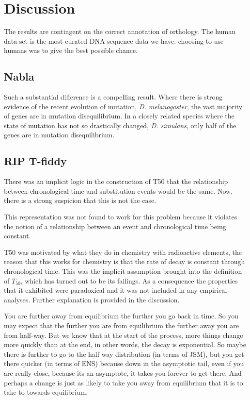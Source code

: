 \chapter{Discussion}

The results are contingent on the correct annotation of orthology. The human data set is the most curated DNA sequence data we have. choosing to use humans was to give the best possible chance.

\section{Nabla}
Such a substantial difference is a compelling result. Where there is strong evidence of the recent evolution of mutation, \textit{D. melanogaster}, the vast majority of genes are in mutation disequilibrium. In a closely related species where the state of mutation has not so drastically changed, \textit{D. simulans}, only half of the genes are in mutation disequilibrium. 

\section{RIP T-fiddy}

There was an implicit logic in the construction of T50 that the relationship between chronological time and substitution events would be the same. Now, there is a strong suspicion that this is not the case. 

This representation was not found to work for this problem because it violates the notion of a relationship between an event and chronological time being constant. 

T50 was motivated by what they do in chemistry with radioactive elements, the reason that this works for chemistry is that the rate of decay is constant through chronological time. This was the implicit assumption brought into the definition of $T_{50}$, which has turned out to be its failings. As a consequence the properties that it exhibited were paradoxical and it was not included in any empirical analyses. Further explanation is provided in the discussion. 


You are further away from equilibrium the further you go back in time. So you may expect that the further you are from equilibrium the further away you are from half-way. But we know that at the start of the process, more things change more quickly than at the end, in other words, the decay is exponential. So maybe there is further to go to the half way distribution (in terms of JSM), but you get there quicker (in terms of ENS) because down in the asymptotic tail, even if you are really close, because its an asymptote, it takes you forever to get there. And perhaps a change is just as likely to take you away from equilibrium that it is to take to towards equilibrium. 

